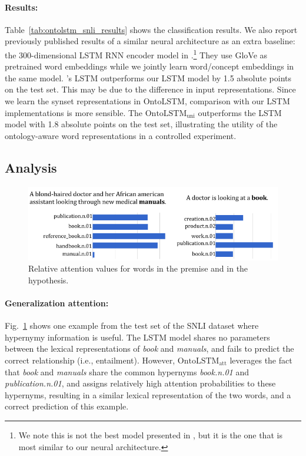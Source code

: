 \paragraph{Results:}
Table~\ref{tab:ontolstm_snli_results} shows the classification results. We also report previously published results of a similar neural architecture as an extra baseline: the 300-dimensional LSTM RNN encoder model in \cite{bowman2016fast}.\footnote{We note this is not the best model presented in \cite{bowman2016fast}, but it is the one that is most similar to our neural architecture.}
They use GloVe as pretrained word embeddings while we jointly learn word/concept embeddings in the same model.
\cite{bowman2016fast}'s LSTM outperforms our LSTM model by 1.5 absolute points on the test set. This may be due to the difference in input representations. Since we learn the synset representations in OntoLSTM, comparison with our LSTM implementations is more sensible.
The $\text{OntoLSTM}_{\text{uni}}$ outperforms the LSTM model with 1.8 absolute points on the test set, illustrating the utility of the ontology-aware word representations in a controlled experiment.

\subsection{Analysis}
\label{sec:discussion}
\begin{figure}
\begin{center}
\includegraphics[width=5in]{figures/ontolstm_snli_comparison.png}
\caption{Relative attention values for words in the premise and in the hypothesis.}
\label{fig:snli_visualization}
\end{center}
\end{figure}

\paragraph{Generalization attention:} \label{sec:generalization}
Fig.~\ref{fig:snli_visualization} shows one example from the test set of the SNLI dataset where hypernymy information is useful. 
The LSTM model shares no parameters between the lexical representations of \textit{book} and \textit{manuals}, and fails to predict the correct relationship (i.e., entailment). 
However, $\text{OntoLSTM}_{\text{att}}$ leverages the fact that \textit{book} and \textit{manuals} share the common hypernyms \textit{book.n.01} and \textit{publication.n.01}, and assigns relatively high attention probabilities to these hypernyms, resulting in a similar lexical representation of the two words, and a correct prediction of this example.

